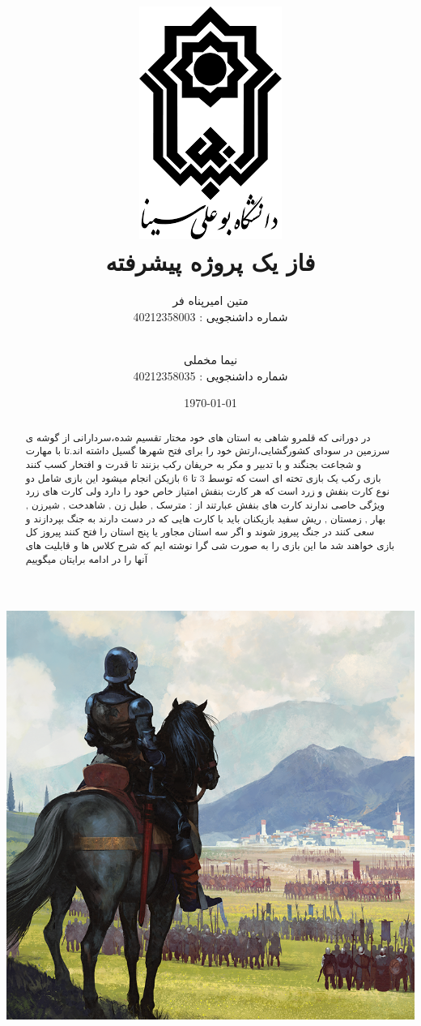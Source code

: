 \documentclass[pdf,titlepage,a4paper]{report}
\title{\includegraphics[scale=0.5]{Graphics/BASU_Logo_header.png} \\ \Huge{فاز یک پروژه پیشرفته}}
\author{متین امیرپناه فر \\ شماره داشنجویی : 40212358003  \and \\ نیما مخملی \\ شماره داشنجویی : 40212358035}
\date{\today}
\begin{document}
	\maketitle
	\tableofcontents
	\newpage
    \includegraphics[scale=5]{Graphics/horse.png}
	\begin{abstract}
	 
     در دورانی که قلمرو شاهی به استان های خود مختار تقسیم شده،سردارانی از گوشه ی سرزمین در سودای کشورگشایی،ارتش خود را برای فتح شهرها گسیل داشته اند.تا با مهارت و شجاعت بجنگند و با تدبیر و مکر به حریفان رکب بزنند تا قدرت و افتخار کسب کنند\\

     بازی رکب یک بازی تخته ای است که توسط 3 تا 6 بازیکن انجام میشود 
	 این بازی شامل دو نوع کارت بنفش و زرد است که هر کارت بنفش امتیاز خاص خود را دارد ولی کارت های زرد ویژگی خاصی ندارند
	 کارت های بنفش عبارتند از : مترسک , طبل زن , شاهدخت ,  شیرزن  ,  بهار  , زمستان , ریش سفید 
	 بازیکنان باید با کارت هایی که در دست دارند به جنگ بپردازند و سعی کنند در جنگ پیروز شوند و اگر سه استان مجاور یا پنج استان را فتح کنند پیروز کل بازی خواهند شد 
	 ما این بازی را به صورت شی گرا نوشته ایم که شرح کلاس ها و قابلیت های آنها را در ادامه برایتان میگوییم 
	\end{abstract}
    
\end{document}
